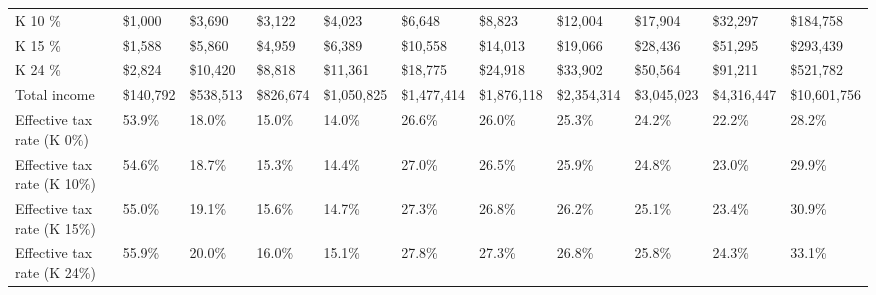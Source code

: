 \documentclass[12pt]{article}
\begin{document}
\begin{landscape}
\begin{table}[]
\begin{tabular}{lllllllllll}
K 10 \%                           & \$1,000   & \$3,690   & \$3,122   & \$4,023     & \$6,648     & \$8,823     & \$12,004    & \$17,904    & \$32,297    & \$184,758    \\
K 15 \%                           & \$1,588   & \$5,860   & \$4,959   & \$6,389     & \$10,558    & \$14,013    & \$19,066    & \$28,436    & \$51,295    & \$293,439    \\
K 24 \%                           & \$2,824   & \$10,420  & \$8,818   & \$11,361    & \$18,775    & \$24,918    & \$33,902    & \$50,564    & \$91,211    & \$521,782    \\
Total income                      & \$140,792 & \$538,513 & \$826,674 & \$1,050,825 & \$1,477,414 & \$1,876,118 & \$2,354,314 & \$3,045,023 & \$4,316,447 & \$10,601,756 \\
Effective tax rate (K 0\%)        & 53.9\%    & 18.0\%    & 15.0\%    & 14.0\%      & 26.6\%      & 26.0\%      & 25.3\%      & 24.2\%      & 22.2\%      & 28.2\%       \\
Effective tax rate (K 10\%)       & 54.6\%    & 18.7\%    & 15.3\%    & 14.4\%      & 27.0\%      & 26.5\%      & 25.9\%      & 24.8\%      & 23.0\%      & 29.9\%       \\
Effective tax rate (K 15\%)       & 55.0\%    & 19.1\%    & 15.6\%    & 14.7\%      & 27.3\%      & 26.8\%      & 26.2\%      & 25.1\%      & 23.4\%      & 30.9\%       \\
Effective tax rate (K 24\%)       & 55.9\%    & 20.0\%    & 16.0\%    & 15.1\%      & 27.8\%      & 27.3\%      & 26.8\%      & 25.8\%      & 24.3\%      & 33.1\%      \\ \hline
\end{tabular}
\end{table}



\end{landscape}
\end{document}
